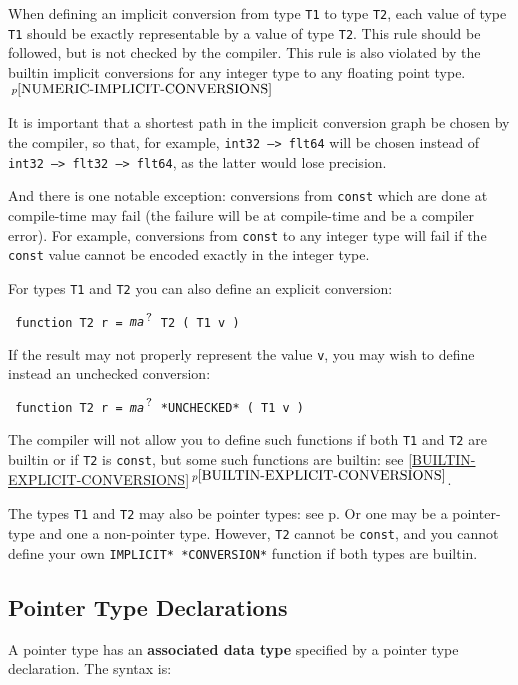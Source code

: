 \documentclass[12pt]{article}
\newcommand{\QMARK}{{$^{\,\mbox{\footnotesize ?}}$}}
\newcommand{\key}[1]{{\rm \bfseries #1}}
\newcommand{\itemref}[1]{\ref{#1}$\,^{p\pageref{#1}}$}
\newcommand{\pagref}[1]{p\pageref{#1}}
\newcommand{\pagnote}[1]{$\,^{p\pageref{#1}}$}
\newenvironment{indpar}[1][0.3in]%
	{\begin{list}{}%
		     {\setlength{\itemsep}{0in}%
		      \setlength{\topsep}{0in}%
		      \setlength{\parsep}{1ex}%
		      \setlength{\labelwidth}{#1}%
		      \setlength{\leftmargin}{#1}%
		      \addtolength{\leftmargin}{\labelsep}}%
	 \item}%
	{\end{list}}
\begin{document}
When defining an implicit conversion from type {\tt T1} to type
{\tt T2}, each value of type {\tt T1} should be exactly representable
by a value of type {\tt T2}.  This rule should be followed, but
is not checked by the compiler.  This rule is also violated by the
builtin implicit conversions for any integer type to any floating
point type.\pagnote{NUMERIC-IMPLICIT-CONVERSIONS}

It is important that a shortest path in the implicit conversion graph
be chosen by the compiler, so that, for example,
{\tt int32 ---> flt64} will be chosen instead of
{\tt int32 ---> flt32 ---> flt64}, as the latter would lose precision.

And there is one notable exception: conversions from {\tt const}
which are done at compile-time may fail (the failure will be at
compile-time and be a compiler error).  For example, conversions
from {\tt const} to any integer type will fail if the {\tt const}
value cannot be encoded exactly in the integer type.

For types {\tt T1} and {\tt T2} you
can also define an explicit conversion:
\begin{indpar} \tt
function T2 r = {\em ma}\QMARK{} T2 ( T1 v )
\end{indpar}
If the result may not properly represent the value {\tt v}, you
may wish to define instead an unchecked conversion:
\begin{indpar} \tt
function T2 r = {\em ma}\QMARK{} *UNCHECKED* ( T1 v )
\end{indpar}
The compiler will not allow you to define such functions if both
{\tt T1} and {\tt T2} are builtin or if {\tt T2} is {\tt const},
but some such functions are
builtin: see \itemref{BUILTIN-EXPLICIT-CONVERSIONS}.

The types {\tt T1} and {\tt T2} may also be pointer types:
see \pagref{POINTER-IMPLICIT-CONVERSION}.  Or one may be a pointer-type
and one a non-pointer type.  However, {\tt T2} cannot
be {\tt const}, and you cannot define your own {\tt *IMPLICIT* *CONVERSION*}
function if both types are builtin.


\subsection{Pointer Type Declarations}
\label{POINTER-TYPE-DECLARATIONS}

A pointer type has an
\key{associated data type}\label{POINTER-ASSOCIATE}
specified by a pointer type declaration.  The syntax is:
\end{document}
